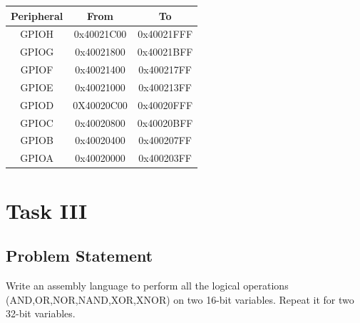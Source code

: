\documentclass[footheight=20pt, footsepline, headheight=20pt, headsepline]{scrartcl}
\begin{document}
\begin{center}
\begin{tabular}{||c c c||} 
 \hline
 Peripheral & From & To \\ [0.5ex] 
 \hline\hline
 GPIOH & 0x40021C00 & 0x40021FFF\\ 
 \hline
 GPIOG & 0x40021800 & 0x40021BFF\\
 \hline
 GPIOF & 0x40021400 & 0x400217FF\\
 \hline
 GPIOE & 0x40021000 & 0x400213FF\\
 \hline
 GPIOD & 0X40020C00 & 0x40020FFF\\
  \hline
 GPIOC & 0x40020800 & 0x40020BFF\\
  \hline
 GPIOB & 0x40020400 & 0x400207FF\\
  \hline
 GPIOA & 0x40020000 & 0x400203FF\\ [1ex] 
 \hline
\end{tabular}
\end{center}


\newpage
\FloatBarrier
\section*{Task III}
\subsection*{Problem Statement}
Write an assembly language to perform all the logical operations (AND,OR,NOR,NAND,XOR,XNOR) on two 16-bit variables. Repeat it for two 32-bit variables.
\end{document}
